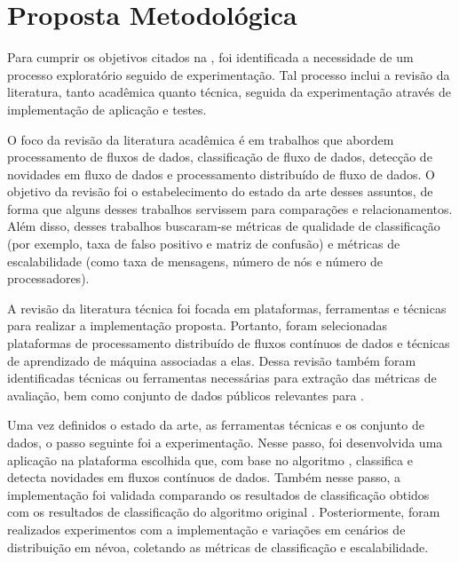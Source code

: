 
\section{Proposta Metodológica}

Para cumprir os objetivos citados na , foi identificada a necessidade
de um processo exploratório seguido de experimentação. Tal processo inclui a
revisão da literatura, tanto acadêmica quanto técnica, seguida da experimentação
através de implementação de aplicação e testes.

O foco da revisão da literatura acadêmica é em trabalhos que abordem
processamento de fluxos de dados, classificação de fluxo de dados, detecção de
novidades em fluxo de dados e processamento distribuído de fluxo de dados.
O objetivo da revisão foi o estabelecimento do estado da arte desses assuntos,
de forma que alguns desses trabalhos servissem para comparações e relacionamentos.
Além disso, desses trabalhos buscaram-se métricas de qualidade de classificação
(por exemplo, taxa de falso positivo e matriz de confusão) e métricas de
escalabilidade (como taxa de mensagens, número de nós e número de processadores).

A revisão da literatura técnica foi focada em plataformas, ferramentas e técnicas
para realizar a implementação proposta.
Portanto, foram selecionadas plataformas de processamento distribuído de fluxos
contínuos de dados
e técnicas de aprendizado de máquina associadas a elas.
Dessa revisão também foram identificadas técnicas ou ferramentas necessárias
para extração das métricas de avaliação, bem como conjunto de dados
públicos relevantes para \nids.

Uma vez definidos o estado da arte, as ferramentas técnicas e os
conjunto de dados, o passo seguinte foi a experimentação.
Nesse passo, foi desenvolvida uma aplicação na plataforma escolhida que, com base no
algoritmo \minas \cite{Faria2016minas}, classifica e detecta novidades em fluxos
contínuos de dados.
Também nesse passo, a implementação foi validada comparando os resultados de
classificação obtidos com os resultados de classificação do algoritmo original
\minas.
Posteriormente, foram realizados experimentos com a implementação e variações em
cenários de distribuição em névoa, coletando as métricas de classificação e
escalabilidade.


